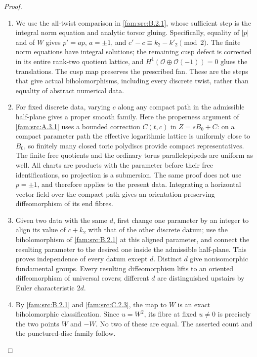 \begin{proof}
\begin{enumerate}[label=\arabic*.,leftmargin=*]
\item We use the all-twist comparison in \cref{fam:src:B.2.1}, whose sufficient step is the integral norm equation and analytic torsor gluing. Specifically, equality of $|p|$ and of $W$ gives
$p'=ap$, $a=\pm1$, and $c'-c\equiv k_2-k'_2\pmod2$.
The finite norm equations have integral solutions; the remaining
cusp defect is corrected in its entire rank-two quotient lattice,
and $H^1(\mathcal O\oplus\mathcal O(-1))=0$ glues the translations.
The cusp map preserves the prescribed fan. These are the steps that
give actual biholomorphisms, including every discrete twist, rather
than equality of abstract numerical data.

\item For fixed discrete data, varying $c$ along any compact path in the
admissible half-plane gives a proper smooth family. Here the
properness argument of \cref{fam:src:A.3.1} uses a bounded correction
$C(t,c)$ in $Z=sB_0+C$: on a compact parameter path the effective
logarithmic lattice is uniformly close to $B_0$, so finitely many
closed toric polydiscs provide compact representatives. The finite
free quotients and the ordinary torus parallelepipeds are uniform
as well. All charts are products with the parameter before their
free identifications, so projection is a submersion. The same proof
does not use $p=\pm1$, and therefore applies to the present data.
Integrating a horizontal vector field over the compact path gives
an orientation-preserving diffeomorphism of its end fibres.

\item Given two data with the same $d$, first change one parameter by an
integer to align its value of $c+k_2$ with that of the other
discrete datum; use the biholomorphism of \cref{fam:src:B.2.1} at this aligned parameter,
and connect the resulting parameter to the desired one inside the
admissible half-plane. This proves independence of every datum
except $d$. Distinct $d$ give nonisomorphic fundamental groups.
Every resulting diffeomorphism lifts to an oriented diffeomorphism
of universal covers; different $d$ are distinguished upstairs by
Euler characteristic $2d$.

\item By \cref{fam:src:B.2.1} and \cref{fam:src:C.2.3}, the map to $W$ is an exact biholomorphic classification.
Since $u=W^2$, its fibre at fixed $u\ne0$ is precisely the two
points $W$ and $-W$. No two of these are equal. The asserted count
and the punctured-disc family follow.
\end{enumerate}
\end{proof}

